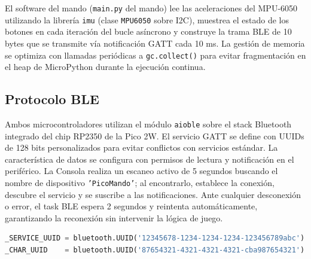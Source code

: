 El software del mando (\texttt{main.py} del mando) lee las aceleraciones del MPU-6050 utilizando la librería \texttt{imu} (clase \texttt{MPU6050} sobre I2C), muestrea el estado de los botones en cada iteración del bucle asíncrono y construye la trama BLE de 10 bytes que se transmite vía notificación GATT cada 10 ms. La gestión de memoria se optimiza con llamadas periódicas a \texttt{gc.collect()} para evitar fragmentación en el heap de MicroPython durante la ejecución continua.

\subsection{Protocolo BLE}
Ambos microcontroladores utilizan el módulo \texttt{aioble} sobre el stack Bluetooth integrado del chip RP2350 de la Pico 2W. El servicio GATT se define con UUIDs de 128 bits personalizados para evitar conflictos con servicios estándar. La característica de datos se configura con permisos de lectura y notificación en el periférico. La Consola realiza un escaneo activo de 5 segundos buscando el nombre de dispositivo \texttt{'PicoMando'}; al encontrarlo, establece la conexión, descubre el servicio y se suscribe a las notificaciones. Ante cualquier desconexión o error, el task BLE espera 2 segundos y reintenta automáticamente, garantizando la reconexión sin intervenir la lógica de juego.

\begin{lstlisting}[language=Python]
_SERVICE_UUID = bluetooth.UUID('12345678-1234-1234-1234-123456789abc')
_CHAR_UUID    = bluetooth.UUID('87654321-4321-4321-4321-cba987654321')
\end{lstlisting}